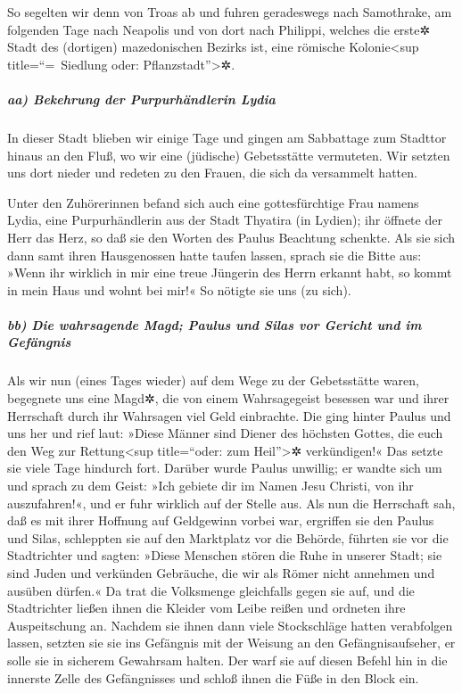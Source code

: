  So segelten wir denn von Troas ab und fuhren geradeswegs
nach Samothrake, am folgenden Tage nach Neapolis  und von
dort nach Philippi, welches die erste✲ Stadt des (dortigen)
mazedonischen Bezirks ist, eine römische Kolonie\textless sup
title=``=~Siedlung oder: Pflanzstadt''\textgreater✲.

\hypertarget{aa-bekehrung-der-purpurhuxe4ndlerin-lydia}{%
\subparagraph{aa) Bekehrung der Purpurhändlerin
Lydia}\label{aa-bekehrung-der-purpurhuxe4ndlerin-lydia}}

In dieser Stadt blieben wir einige Tage  und gingen am
Sabbattage zum Stadttor hinaus an den Fluß, wo wir eine (jüdische)
Gebetsstätte vermuteten. Wir setzten uns dort nieder und redeten zu den
Frauen, die sich da versammelt hatten.

 Unter den Zuhörerinnen befand sich auch eine
gottesfürchtige Frau namens Lydia, eine Purpurhändlerin aus der Stadt
Thyatira (in Lydien); ihr öffnete der Herr das Herz, so daß sie den
Worten des Paulus Beachtung schenkte.  Als sie sich dann
samt ihren Hausgenossen hatte taufen lassen, sprach sie die Bitte aus:
»Wenn ihr wirklich in mir eine treue Jüngerin des Herrn erkannt habt, so
kommt in mein Haus und wohnt bei mir!« So nötigte sie uns (zu sich).

\hypertarget{bb-die-wahrsagende-magd-paulus-und-silas-vor-gericht-und-im-gefuxe4ngnis}{%
\subparagraph{bb) Die wahrsagende Magd; Paulus und Silas vor Gericht und
im
Gefängnis}\label{bb-die-wahrsagende-magd-paulus-und-silas-vor-gericht-und-im-gefuxe4ngnis}}

 Als wir nun (eines Tages wieder) auf dem Wege zu der
Gebetsstätte waren, begegnete uns eine Magd✲, die von einem
Wahrsagegeist besessen war und ihrer Herrschaft durch ihr Wahrsagen viel
Geld einbrachte.  Die ging hinter Paulus und uns her und
rief laut: »Diese Männer sind Diener des höchsten Gottes, die euch den
Weg zur Rettung\textless sup title=``oder: zum Heil''\textgreater✲
verkündigen!«  Das setzte sie viele Tage hindurch fort.
Darüber wurde Paulus unwillig; er wandte sich um und sprach zu dem
Geist: »Ich gebiete dir im Namen Jesu Christi, von ihr auszufahren!«,
und er fuhr wirklich auf der Stelle aus.  Als nun die
Herrschaft sah, daß es mit ihrer Hoffnung auf Geldgewinn vorbei war,
ergriffen sie den Paulus und Silas, schleppten sie auf den Marktplatz
vor die Behörde,  führten sie vor die Stadtrichter und
sagten: »Diese Menschen stören die Ruhe in unserer Stadt; sie sind Juden
 und verkünden Gebräuche, die wir als Römer nicht
annehmen und ausüben dürfen.«  Da trat die Volksmenge
gleichfalls gegen sie auf, und die Stadtrichter ließen ihnen die Kleider
vom Leibe reißen und ordneten ihre Auspeitschung an. 
Nachdem sie ihnen dann viele Stockschläge hatten verabfolgen lassen,
setzten sie sie ins Gefängnis mit der Weisung an den Gefängnisaufseher,
er solle sie in sicherem Gewahrsam halten.  Der warf sie
auf diesen Befehl hin in die innerste Zelle des Gefängnisses und schloß
ihnen die Füße in den Block ein.

